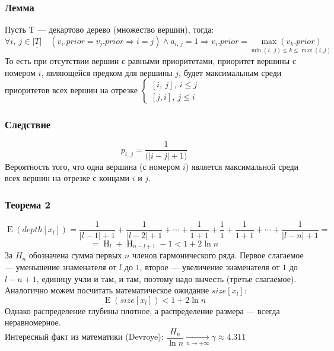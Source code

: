 \documentclass[12pt, a4paper]{article}
\begin{document}
    \subsubsection{Лемма}
    Пусть T --- декартово дерево (множество вершин), тогда:
    \[\forall i,\ j\in \underline{|T|}\quad (v_i.prior = v_j.prior \Rightarrow i = j)\wedge a_{i,\, j} = 1\Rightarrow v_i.prior = \underset{\min(i,\ j)\leq k \leq \max(i, j)}{\max(v_k.prior)}\]
    То есть при отсутствии вершин с равными приоритетами, приоритет вершины с номером $i$, являющейся предком для вершины $j$, будет максимальным среди приоритетов всех вершин на отрезке $\begin{cases}
        [i,\ j],\ i \leq j\\
        [j, i],\ j \leq i
    \end{cases}$
    \subsubsection{Следствие}
    \[p_{i,\, j} = \frac{1}{\big( |i - j| + 1 \big)}\]
    Вероятность того, что одна вершина (с номером $i$) является максимальной среди всех вершин на отрезке с концами $i$ и $j$.
    \subsubsection{Теорема 2}
    \[\operatorname{E}(depth[x_l]) = \frac{1}{|l - 1| + 1} + \frac{1}{|l - 2| + 1} + \cdots + \frac{1}{1 + 1} + \frac{1}{1} + \frac{1}{1 + 1} + \cdots + \frac{1}{|l - n| + 1} =\]
    \[= \operatorname{H}_{l} + \operatorname{H}_{n - l + 1} - 1 < 1 + 2\ln n\]
    За $H_n$ обозначена сумма первых $n$ членов гармонического ряда. Первое слагаемое --- уменьшение знаменателя от $l$ до $1$, второе --- увеличение знаменателя от $1$ до $l - n + 1$, единицу учли и там, и там, поэтому надо вычесть (третье слагаемое).
    Аналогично можем посчитать математическое ожидание $size[x_l]$:
    \[\operatorname{E}(size[x_l]) < 1 + 2\ln n\]
    Однако распределение глубины плотное, а распределение размера --- всегда неравномерное.\\
    Интересный факт из математики (Devroye): $\dfrac{H_n}{\ln n} \xrightarrow[n\to +\infty]{} \gamma \approx 4.311$
\end{document}
